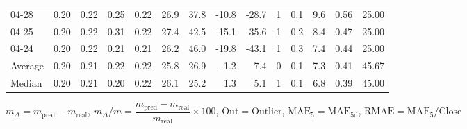 \begin{threeparttable}
{\begin{tabular}{lrrrrrrrrrrrrr}
  04-28 &          0.20 &          0.22 &          0.25 &        0.22 &                26.9 &                37.8 &      -10.8 &        -28.7 &              1 &                 0.1 &              9.6 &            0.56 &                  25.00 \\
  04-25 &          0.20 &          0.22 &          0.31 &        0.22 &                27.4 &                42.5 &      -15.1 &        -35.6 &              1 &                 0.2 &              8.4 &            0.47 &                  25.00 \\
  04-24 &          0.20 &          0.22 &          0.21 &        0.21 &                26.2 &                46.0 &      -19.8 &        -43.1 &              1 &                 0.3 &              7.4 &            0.44 &                  25.00 \\
Average &          0.20 &          0.21 &          0.22 &        0.22 &                25.8 &                26.9 &       -1.2 &          7.4 &              0 &                 0.1 &              7.3 &            0.41 &                  45.67 \\
 Median &          0.20 &          0.21 &          0.20 &        0.22 &                26.1 &                25.2 &        1.3 &          5.1 &              1 &                 0.1 &              6.8 &            0.39 &                  45.00 \\
\bottomrule
\end{tabular}
}
\begin{tablenotes}\footnotesize
\item $m_\Delta=m_{\text{pred}}-m_{\text{real}}$,
$m_\Delta/m=\dfrac{m_{\text{pred}}-m_{\text{real}}}{m_{\text{real}}}\times100$,
$\mathrm{Out}=\text{Outlier}$,
$\mathrm{MAE}_5=\mathrm{MAE}_{5\text{d}}$,
$\mathrm{RMAE}=\mathrm{MAE}_5/\text{Close}$
\end{tablenotes}
\end{threeparttable}
\endgroup

